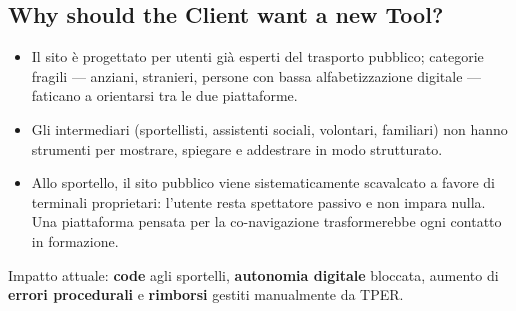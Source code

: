 ﻿\documentclass[11pt,a4paper]{article}
\begin{document}
\subsection{Why should the Client want a new Tool?}
\begin{itemize}[leftmargin=*]
    \item Il sito è progettato per utenti già esperti del trasporto pubblico;
    categorie fragili --- anziani, stranieri, persone con bassa alfabetizzazione
    digitale --- faticano a orientarsi tra le due piattaforme.
    \item Gli intermediari (sportellisti, assistenti sociali, volontari,
    familiari) non hanno strumenti per mostrare, spiegare e addestrare in
    modo strutturato.
    \item Allo sportello, il sito pubblico viene sistematicamente scavalcato
    a favore di terminali proprietari: l'utente resta spettatore passivo e
    non impara nulla. Una piattaforma pensata per la co-navigazione
    trasformerebbe ogni contatto in formazione.
\end{itemize}
Impatto attuale: \textbf{code} agli sportelli, \textbf{autonomia digitale}
bloccata, aumento di \textbf{errori procedurali} e \textbf{rimborsi} gestiti
manualmente da TPER.
\end{document}
